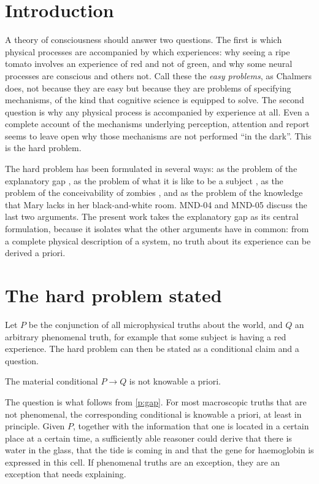 \documentclass{situationist-preprint}
\begin{document}
\section{Introduction}

A theory of consciousness should answer two questions. The first is which physical processes are accompanied by which experiences: why seeing a ripe tomato involves an experience of red and not of green, and why some neural processes are conscious and others not. Call these the \emph{easy problems}, as Chalmers does, not because they are easy but because they are problems of specifying mechanisms, of the kind that cognitive science is equipped to solve. The second question is why any physical process is accompanied by experience at all. Even a complete account of the mechanisms underlying perception, attention and report seems to leave open why those mechanisms are not performed \enquote{in the dark}. This is the hard problem.

The hard problem has been formulated in several ways: as the problem of the explanatory gap \citep{Levine1983}, as the problem of what it is like to be a subject \citep{Nagel1974}, as the problem of the conceivability of zombies \citep{Chalmers1996}, and as the problem of the knowledge that Mary lacks in her black-and-white room. MND-04 and MND-05 discuss the last two arguments. The present work takes the explanatory gap as its central formulation, because it isolates what the other arguments have in common: from a complete physical description of a system, no truth about its experience can be derived a priori.

\section{The hard problem stated}

Let $P$ be the conjunction of all microphysical truths about the world, and $Q$ an arbitrary phenomenal truth, for example that some subject is having a red experience. The hard problem can then be stated as a conditional claim and a question.

\begin{principle}\label{p:gap}
The material conditional $P \to Q$ is not knowable a priori.
\end{principle}

The question is what follows from \ref{p:gap}. For most macroscopic truths that are not phenomenal, the corresponding conditional is knowable a priori, at least in principle. Given $P$, together with the information that one is located in a certain place at a certain time, a sufficiently able reasoner could derive that there is water in the glass, that the tide is coming in and that the gene for haemoglobin is expressed in this cell. If phenomenal truths are an exception, they are an exception that needs explaining.
\end{document}

